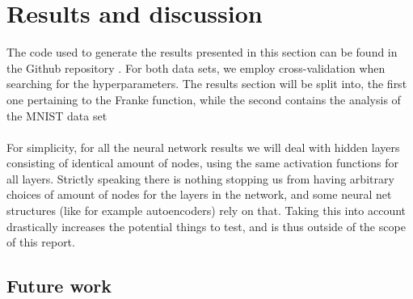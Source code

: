 \documentclass[a4paper]{article}
\begin{document}
\section{Results and discussion} \label{chap:results}
The code used to generate the results presented in this section can be found in the Github repository \cite{Github2}. For both data sets, we employ cross-validation when searching for the hyperparameters. The results section will be split into, the first one pertaining to the Franke function, while the second contains the analysis of the MNIST data set
\\\\
For simplicity, for all the neural network results we will deal with hidden layers consisting of identical amount of nodes, using the same activation functions for all layers. Strictly speaking there is nothing stopping us from having arbitrary choices of amount of nodes for the layers in the network, and some neural net structures (like for example autoencoders) rely on that. Taking this into account drastically increases the potential things to test, and is thus outside of the scope of this report.


\subsection{Future work} \label{sec:future}

\end{document}
